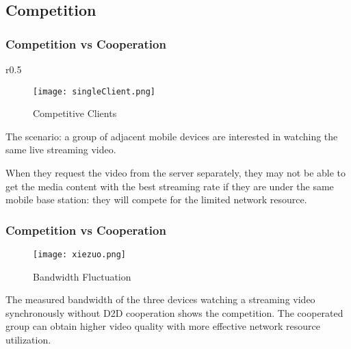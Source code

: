 \documentclass[table]{beamer}
\begin{document}
\subsection{Competition}
\begin{frame}
	\frametitle{Competition vs Cooperation}	
\begin{wrapfigure}{r}{0.5\textwidth}
  \vspace{-20pt}
	\begin{figure}[htbp]
    \centering
		\texttt{[image: singleClient.png]}
    \caption{Competitive Clients}
    \label{fig:singleClient}
    \end{figure}
  \vspace{-20pt}
\end{wrapfigure}
The scenario: a group of {\color{red} adjacent} mobile devices are interested in watching the {\color{red} same} live streaming video.

\vspace{10pt}
When they request the video from the server separately, they may not be able to get the media content with the best streaming rate if they are under the same mobile base station: they will {\color{red} compete} for the limited network resource.
\end{frame}

\begin{frame}
	\frametitle{Competition vs Cooperation}
  \vspace{-20pt}
	\begin{figure}[htbp]
    \centering
		\texttt{[image: xiezuo.png]}
    \caption{Bandwidth Fluctuation}
    \label{fig:xiezuo}
    \end{figure}
  \vspace{-20pt}

The measured bandwidth of the three devices watching a streaming video synchronously without D2D cooperation shows the competition. The cooperated group can obtain higher video quality with more effective network resource utilization.
\end{frame}
\end{document}
